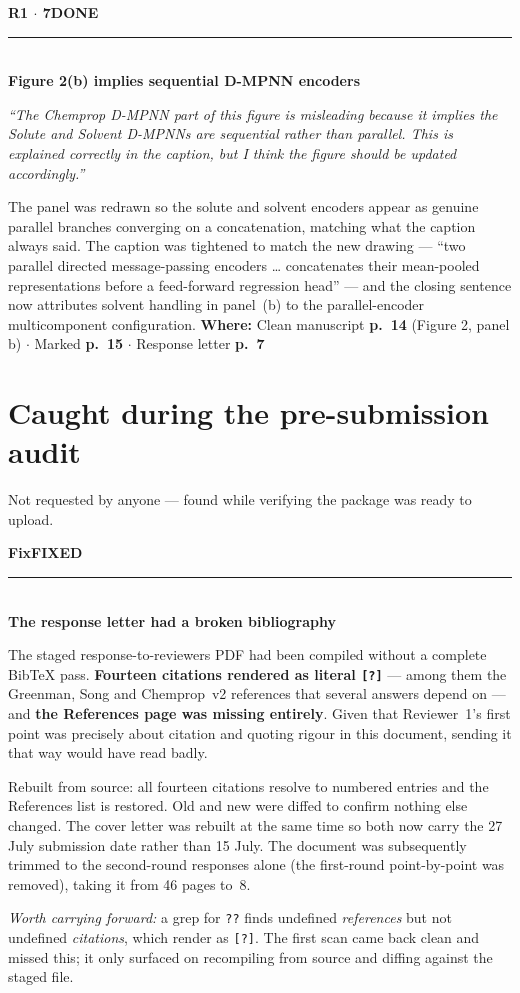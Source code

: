 \documentclass[11pt]{article}
\newcommand{\itemhead}[4]{%
  \needspace{4\baselineskip}%
  \vspace{0.5em}%
  {\bfseries\color{accent}#1}\hfill{\small\bfseries\color{#3}\MakeUppercase{#2}}\\[-0.4em]
  \textcolor{rulegrey}{\rule{\linewidth}{0.4pt}}\\[-0.2em]
  {\bfseries #4}\par\vspace{-0.15em}%
}
\newcommand{\quo}[1]{{\small\itshape\color{inkmute}``#1''}\par}
\newcommand{\where}[1]{%
  \vspace{0.15em}%
  {\small\textcolor{inkmute}{\textbf{Where:}} #1}\par
}
\begin{document}
\itemhead{R1 $\cdot$ 7}{done}{done}{Figure 2(b) implies sequential D-MPNN encoders}
\quo{The Chemprop D-MPNN part of this figure is misleading because it implies the Solute and Solvent D-MPNNs are sequential rather than parallel. This is explained correctly in the caption, but I think the figure should be updated accordingly.}
The panel was redrawn so the solute and solvent encoders appear as genuine parallel branches converging on a
concatenation, matching what the caption always said. The caption was tightened to match the new drawing ---
``two parallel directed message-passing encoders \ldots{} concatenates their mean-pooled representations
before a feed-forward regression head'' --- and the closing sentence now attributes solvent handling in
panel~(b) to the parallel-encoder multicomponent configuration.
\where{Clean manuscript \textbf{p.~14} (Figure 2, panel b) $\cdot$ Marked \textbf{p.~15} $\cdot$
Response letter \textbf{p.~7}}

\section{Caught during the pre-submission audit}
{\small\color{inkmute} Not requested by anyone --- found while verifying the package was ready to upload.}

\itemhead{Fix}{fixed}{done}{The response letter had a broken bibliography}
The staged response-to-reviewers PDF had been compiled without a complete BibTeX pass.
\textbf{Fourteen citations rendered as literal \texttt{[?]}} --- among them the Greenman, Song and
Chemprop~v2 references that several answers depend on --- and \textbf{the References page was missing
entirely}. Given that Reviewer~1's first point was precisely about citation and quoting rigour in this
document, sending it that way would have read badly.

Rebuilt from source: all fourteen citations resolve to numbered entries and the References list is restored.
Old and new were diffed to confirm nothing else changed. The cover letter was rebuilt at the same time so
both now carry the 27 July submission date rather than 15 July. The document was subsequently trimmed to
the second-round responses alone (the first-round point-by-point was removed), taking it from 46 pages to~8.

\textit{Worth carrying forward:} a grep for \texttt{??} finds undefined \emph{references} but not undefined
\emph{citations}, which render as \texttt{[?]}. The first scan came back clean and missed this; it only
surfaced on recompiling from source and diffing against the staged file.
\end{document}
